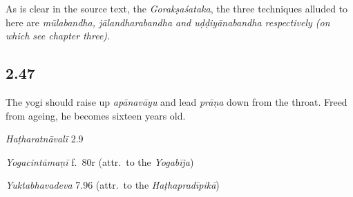 \begin{ekdosis}
\begin{philcomm}[hp02_046]
As is clear in the source text, the \emph{Gorakṣaśataka}, the three techniques alluded to here are \sl{mūlabandha, jālandharabandha} and \emph{uḍḍiyānabandha} respectively (on which see chapter three).
\end{philcomm}

\subsection*{2.47}
\begin{translation}[hp02_047]
The yogi should raise up \emph{apānavāyu} and lead \emph{prāṇa} down from the throat. Freed from ageing, he becomes sixteen years old.
\end{translation}


\begin{testimonia}[hp02_047]
\emph{Haṭharatnāvalī} 2.9
\begin{versinnote}
\end{versinnote} 

\emph{Yogacintāmaṇī} f.~80r (attr.~to the \emph{Yogabīja})

\begin{versinnote}
\end{versinnote}

\emph{Yuktabhavadeva} 7.96 (attr.~to the \emph{Haṭhapradīpikā})

\begin{versinnote}
\end{versinnote}
\end{testimonia}



\end{ekdosis}
